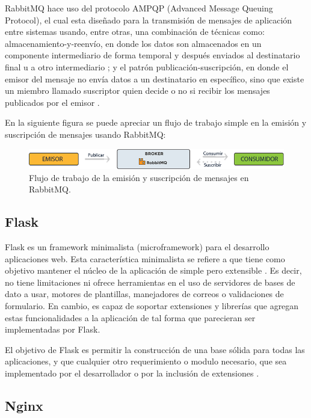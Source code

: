 RabbitMQ hace uso del protocolo AMPQP (Advanced Message Queuing Protocol), el cual esta diseñado para la transmisión
de mensajes de aplicación entre sistemas usando, entre otras, una combinación de técnicas como: almacenamiento-y-reenvío, en donde
los datos son almacenados en un componente intermediario de forma temporal y después enviados al destinatario final u a otro
intermediario \cite{15}; y el patrón publicación-suscripción, en donde el emisor del mensaje no envía datos a un destinatario
en específico, sino que existe un miembro llamado suscriptor quien decide o no si recibir los mensajes publicados por el emisor \cite{16}.

En la siguiente figura se puede apreciar un flujo de trabajo simple en la emisión y suscripción de mensajes usando RabbitMQ:

\begin{figure}[H]
	\centering
		\includegraphics[width=1\textwidth]{figures/workflow_rabbitmq}
	\caption{Flujo de trabajo de la emisión y suscripción de mensajes en RabbitMQ.}
	\label{fig:workflow_rabbitmq}
\end{figure}

\subsection{Flask}

Flask es un framework minimalista (microframework) para el desarrollo aplicaciones
web. Esta característica minimalista se refiere a que tiene como objetivo mantener
el núcleo de la aplicación de simple pero extensible \cite{19}.
Es decir, no tiene limitaciones ni ofrece herramientas en el uso de servidores de
bases de dato a usar, motores de plantillas, manejadores de correos o validaciones de
formulario. En cambio, es capaz de soportar extensiones y librerías que agregan
estas funcionalidades a la aplicación de tal forma que parecieran ser implementadas por Flask.

El objetivo de Flask es permitir la construcción de una base sólida para todas las
aplicaciones, y que cualquier otro requerimiento o modulo necesario, que sea
implementado por el desarrollador o por la inclusión de extensiones \cite{20}.

\subsection{Nginx}

